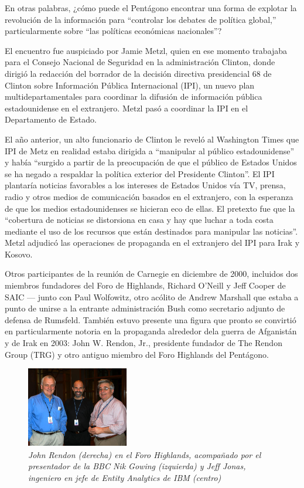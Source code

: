 \documentclass[10pt,a5paper,twoside,spanish,]{book}
\begin{document}
En otras palabras, ¿cómo puede el Pentágono encontrar una forma de
explotar la revolución de la información para ``controlar los debates de
política global,'' particularmente sobre ``las políticas económicas
nacionales''?

El encuentro fue auspiciado por Jamie Metzl, quien en ese momento
trabajaba para el Consejo Nacional de Seguridad en la administración
Clinton, donde dirigió la redacción del borrador de la decisión
directiva presidencial 68 de Clinton sobre Información Pública
Internacional (IPI), un nuevo plan multidepartamentales para coordinar
la difusión de información pública estadounidense en el extranjero.
Metzl pasó a coordinar la IPI en el Departamento de Estado.

El año anterior, un alto funcionario de Clinton le reveló al Washington
Times que IPI de Metz en realidad estaba dirigida a ``manipular al
público estadounidense'' y había ``surgido a partir de la preocupación
de que el público de Estados Unidos se ha negado a respaldar la política
exterior del Presidente Clinton''. El IPI plantaría noticias favorables
a los intereses de Estados Unidos vía TV, prensa, radio y otros medios
de comunicación basados en el extranjero, con la esperanza de que los
medios estadounidenses se hicieran eco de ellas. El pretexto fue que la
``cobertura de noticias se distorsiona en casa y hay que luchar a toda
costa mediante el uso de los recursos que están destinados para
manipular las noticias''. Metzl adjudicó las operaciones de propaganda
en el extranjero del IPI para Irak y Kosovo.

Otros participantes de la reunión de Carnegie en diciembre de 2000,
incluidos dos miembros fundadores del Foro de Highlands, Richard O'Neill
y Jeff Cooper de SAIC --- junto con Paul Wolfowitz, otro acólito de
Andrew Marshall que estaba a punto de unirse a la entrante
administración Bush como secretario adjunto de defensa de Rumsfeld.
También estuvo presente una figura que pronto se convirtió en
particularmente notoria en la propaganda alrededor dela guerra de
Afganistán y de Irak en 2003: John W. Rendon, Jr., presidente fundador
de The Rendon Group (TRG) y otro antiguo miembro del Foro Highlands del
Pentágono.

\begin{figure}[htbp]
\centering
\includegraphics{2.3.png}
\caption{\emph{John Rendon (derecha) en el Foro Highlands, acompañado
por el presentador de la BBC Nik Gowing (izquierda) y Jeff Jonas,
ingeniero en jefe de Entity Analytics de IBM (centro)}}
\end{figure}
\end{document}

